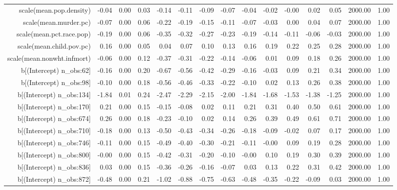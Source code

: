 \begin{table}[ht]
\begin{tabular}{rrrrrrrrrrrrrrr}
  scale(mean.pop.density) & -0.04 & 0.00 & 0.03 & -0.14 & -0.11 & -0.09 & -0.07 & -0.04 & -0.02 & -0.00 & 0.02 & 0.05 & 2000.00 & 1.00 \\ 
  scale(mean.murder.pc) & -0.07 & 0.00 & 0.06 & -0.22 & -0.19 & -0.15 & -0.11 & -0.07 & -0.03 & 0.00 & 0.04 & 0.07 & 2000.00 & 1.00 \\ 
  scale(mean.pct.race.pop) & -0.19 & 0.00 & 0.06 & -0.35 & -0.32 & -0.27 & -0.23 & -0.19 & -0.14 & -0.11 & -0.06 & -0.03 & 2000.00 & 1.00 \\ 
  scale(mean.child.pov.pc) & 0.16 & 0.00 & 0.05 & 0.04 & 0.07 & 0.10 & 0.13 & 0.16 & 0.19 & 0.22 & 0.25 & 0.28 & 2000.00 & 1.00 \\ 
  scale(mean.nonwht.infmort) & -0.06 & 0.00 & 0.12 & -0.37 & -0.31 & -0.22 & -0.14 & -0.06 & 0.01 & 0.09 & 0.18 & 0.26 & 2000.00 & 1.00 \\ 
  b[(Intercept) n\_obs:62] & -0.16 & 0.00 & 0.20 & -0.67 & -0.56 & -0.42 & -0.29 & -0.16 & -0.03 & 0.09 & 0.21 & 0.34 & 2000.00 & 1.00 \\ 
  b[(Intercept) n\_obs:98] & -0.10 & 0.00 & 0.18 & -0.56 & -0.46 & -0.33 & -0.22 & -0.10 & 0.02 & 0.13 & 0.26 & 0.38 & 2000.00 & 1.00 \\ 
  b[(Intercept) n\_obs:134] & -1.84 & 0.01 & 0.24 & -2.47 & -2.29 & -2.15 & -2.00 & -1.84 & -1.68 & -1.53 & -1.38 & -1.25 & 2000.00 & 1.00 \\ 
  b[(Intercept) n\_obs:170] & 0.21 & 0.00 & 0.15 & -0.15 & -0.08 & 0.02 & 0.11 & 0.21 & 0.31 & 0.40 & 0.50 & 0.61 & 2000.00 & 1.00 \\ 
  b[(Intercept) n\_obs:674] & 0.26 & 0.00 & 0.18 & -0.23 & -0.10 & 0.02 & 0.14 & 0.26 & 0.39 & 0.49 & 0.61 & 0.71 & 2000.00 & 1.00 \\ 
  b[(Intercept) n\_obs:710] & -0.18 & 0.00 & 0.13 & -0.50 & -0.43 & -0.34 & -0.26 & -0.18 & -0.09 & -0.02 & 0.07 & 0.17 & 2000.00 & 1.00 \\ 
  b[(Intercept) n\_obs:746] & -0.11 & 0.00 & 0.15 & -0.49 & -0.40 & -0.30 & -0.21 & -0.11 & -0.00 & 0.09 & 0.19 & 0.28 & 2000.00 & 1.00 \\ 
  b[(Intercept) n\_obs:800] & -0.00 & 0.00 & 0.15 & -0.42 & -0.31 & -0.20 & -0.10 & -0.00 & 0.10 & 0.19 & 0.30 & 0.39 & 2000.00 & 1.00 \\ 
  b[(Intercept) n\_obs:836] & 0.03 & 0.00 & 0.15 & -0.36 & -0.26 & -0.16 & -0.07 & 0.03 & 0.13 & 0.22 & 0.31 & 0.42 & 2000.00 & 1.00 \\ 
  b[(Intercept) n\_obs:872] & -0.48 & 0.00 & 0.21 & -1.02 & -0.88 & -0.75 & -0.63 & -0.48 & -0.35 & -0.22 & -0.09 & 0.03 & 2000.00 & 1.00 \\ 

\end{tabular}
\end{table}
